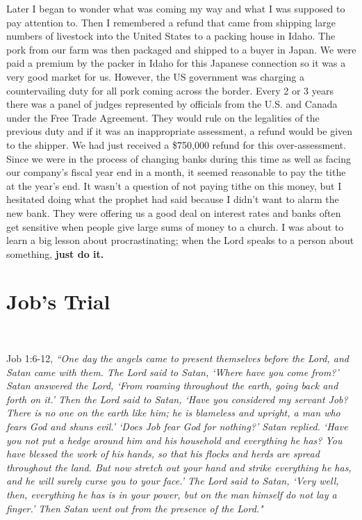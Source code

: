 \documentclass[oneside,12pt]{book}
\begin{document}
Later I began to wonder what was coming my way and what I was supposed to pay attention to. Then I remembered a refund that came from shipping large numbers of livestock into the United States to a packing house in Idaho. The pork from our farm was then packaged and shipped to a buyer in Japan. We were paid a premium by the packer in Idaho for this Japanese connection so it was a very good market for us. However, the US government was charging a countervailing duty for all pork coming across the border. Every 2 or 3 years there was a panel of judges represented by officials from the U.S. and Canada under the Free Trade Agreement. They would rule on the legalities of the previous duty and if it was an inappropriate assessment, a refund would be given to the shipper. We had just received a \$750,000 refund for this over-assessment. Since we were in the process of changing banks during this time as well as facing our company's fiscal year end in a month, it seemed reasonable to pay the tithe at the year's end. It wasn't a question of not paying tithe on this money, but I hesitated doing what the prophet had said because I didn't want to alarm the new bank. They were offering us a good deal on interest rates and banks often get sensitive when people give large sums of money to a church. I was about to learn a big lesson about procrastinating; when the Lord speaks to a person about something, \textbf{just do it.}


\section{Job's Trial}
\

Job 1:6-12, \textit{``One day the angels came to present themselves before the Lord, and Satan came with them. The Lord said to Satan, `Where have you come from?' Satan answered the Lord, `From roaming throughout the earth, going back and forth on it.' Then the Lord said to Satan, `Have you considered my servant Job? There is no one on the earth like him; he is blameless and upright, a man who fears God and shuns evil.' `Does Job fear God for nothing?' Satan replied. `Have you not put a hedge around him and his household and everything he has? You have blessed the work of his hands, so that his flocks and herds are spread throughout the land. But now stretch out your hand and strike everything he has, and he will surely curse you to your face.' The Lord said to Satan, `Very well, then, everything he has is in your power, but on the man himself do not lay a finger.' Then Satan went out from the presence of the Lord."}
\end{document}
